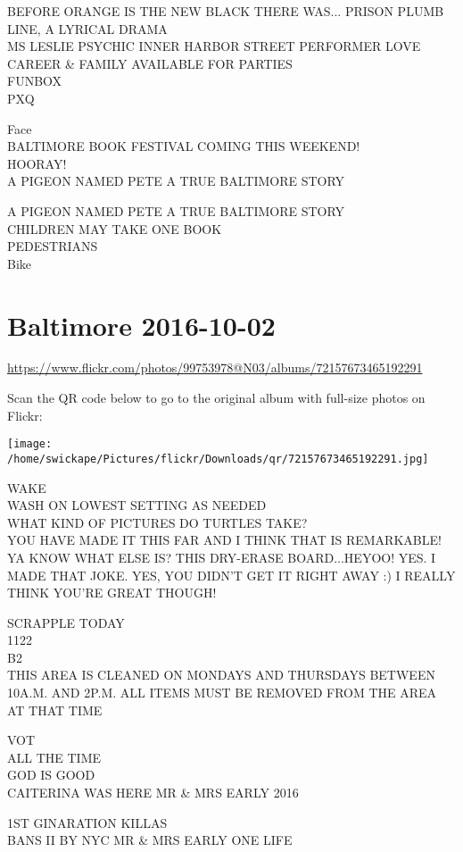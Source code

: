 \documentclass[10pt,letterpaper]{article}
\begin{document}
BEFORE ORANGE IS THE NEW BLACK THERE WAS... PRISON PLUMB LINE, A LYRICAL DRAMA\\
MS LESLIE PSYCHIC INNER HARBOR STREET PERFORMER LOVE CAREER \& FAMILY AVAILABLE FOR PARTIES\\
FUNBOX\\
PXQ

Face\\
BALTIMORE BOOK FESTIVAL COMING THIS WEEKEND!\\
HOORAY!\\
A PIGEON NAMED PETE A TRUE BALTIMORE STORY

A PIGEON NAMED PETE A TRUE BALTIMORE STORY\\
CHILDREN MAY TAKE ONE BOOK\\
PEDESTRIANS\\
Bike
\pagebreak

\section*{Baltimore 2016-10-02}

\url{https://www.flickr.com/photos/99753978@N03/albums/72157673465192291}

Scan the QR code below to go to the original album with full-size photos on Flickr:

\texttt{[image: /home/swickape/Pictures/flickr/Downloads/qr/72157673465192291.jpg]}
\pagebreak

WAKE\\
WASH ON LOWEST SETTING AS NEEDED\\
WHAT KIND OF PICTURES DO TURTLES TAKE?\\
YOU HAVE MADE IT THIS FAR AND I THINK THAT IS REMARKABLE!  YA KNOW WHAT ELSE IS?  THIS DRY{-}ERASE BOARD...HEYOO! YES.  I MADE THAT JOKE.  YES, YOU DIDN'T GET IT RIGHT AWAY :) I REALLY THINK YOU'RE GREAT THOUGH!

SCRAPPLE TODAY\\
1122\\
B2\\
THIS AREA IS CLEANED ON MONDAYS AND THURSDAYS BETWEEN 10A.M. AND 2P.M. ALL ITEMS MUST BE REMOVED FROM THE AREA AT THAT TIME

VOT\\
ALL THE TIME\\
GOD IS GOOD\\
CAITERINA WAS HERE MR \& MRS EARLY 2016

1ST GINARATION KILLAS\\
BANS II BY NYC MR \& MRS EARLY ONE LIFE
\end{document}
